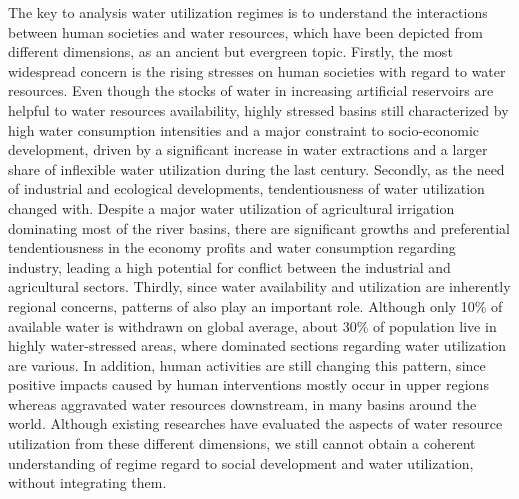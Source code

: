 \documentclass[9pt, twocolumn, twoside, lineno]{pnas-new}
\begin{document}
The key to analysis water utilization regimes is to understand the interactions between human societies and water resources, 
which have been depicted from different dimensions, as an ancient but evergreen topic.
Firstly, the most widespread concern is the rising stresses on human societies with regard to water resources.
Even though the stocks of water in increasing artificial reservoirs are helpful to water resources availability, 
highly stressed basins still characterized by high water consumption intensities and a major constraint to socio-economic development,
driven by a significant increase in water extractions and a larger share of inflexible water utilization during the last century.
\cite{postelHumanAppropriationRenewable1996, greveGlobalAssessmentWater2018a, qinFlexibilityIntensityGlobal2019}
Secondly, as the need of industrial and ecological developments, tendentiousness of water utilization changed with.
Despite a major water utilization of agricultural irrigation dominating most of the river basins,
there are significant growths and preferential tendentiousness in the economy profits and water consumption regarding industry, 
leading a high potential for conflict between the industrial and agricultural sectors.
\cite{liuWaterScarcityAssessments2017, florkeWaterCompetitionCities2018}
Thirdly, since water availability and utilization are inherently regional concerns, patterns of also play an important role.
Although only 10\% of available water is withdrawn on global average, about 30\% of population live in highly water-stressed areas,
where dominated sections regarding water utilization are various. 
\cite{wadaWedgeApproachWater2014, okiGlobalHydrologicalCycles2006}
In addition, human activities are still changing this pattern, 
since positive impacts caused by human interventions mostly occur in upper regions 
whereas aggravated water resources downstream, in many basins around the world.
\cite{veldkampWaterScarcityHotspots2017}
Although existing researches have evaluated the aspects of water resource utilization from these different dimensions, 
we still cannot obtain a coherent understanding of regime regard to social development and water utilization, without integrating them.
\end{document}
